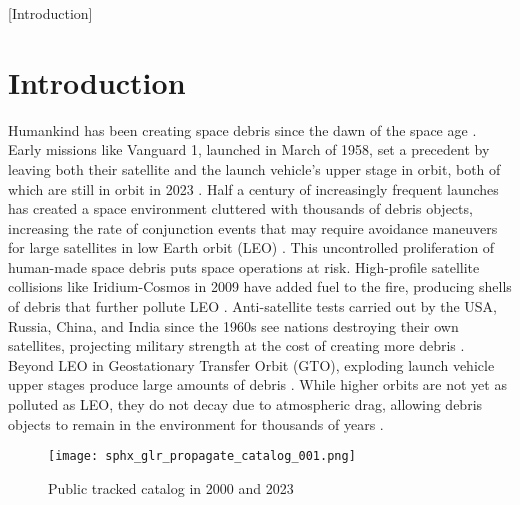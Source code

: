 [Introduction]
\graphicspath{{/Users/liamrobinson/Documents/PyLightCurves/docs/build/html/_images}}

\chapter{Introduction}

Humankind has been creating space debris since the dawn of the space age \cite{esareport2022}. Early missions like Vanguard 1, launched in March of 1958, set a precedent by leaving both their satellite and the launch vehicle's upper stage in orbit, both of which are still in orbit in 2023 \cite{vanguard1}. Half a century of increasingly frequent launches has created a space environment cluttered with thousands of debris objects, increasing the rate of conjunction events that may require avoidance maneuvers for large satellites in low Earth orbit (LEO) \cite{esareport2022}. This uncontrolled proliferation of human-made space debris puts space operations at risk. High-profile satellite collisions like Iridium-Cosmos in 2009 have added fuel to the fire, producing shells of debris that further pollute LEO \cite{vallado4ed}. Anti-satellite tests carried out by the USA, Russia, China, and India since the 1960s see nations destroying their own satellites, projecting military strength at the cost of creating more debris \cite{vallado4ed}. Beyond LEO in Geostationary Transfer Orbit (GTO), exploding launch vehicle upper stages produce large amounts of debris \cite{esareport2022}. While higher orbits are not yet as polluted as LEO, they do not decay due to atmospheric drag, allowing debris objects to remain in the environment for thousands of years \cite{vallado4ed}.

\begin{figure}[ht]
    \centering
    \texttt{[image: sphx\_glr\_propagate\_catalog\_001.png]}
    \caption{Public tracked catalog in 2000 and 2023}
    \label{fig:catalog_comparison}
\end{figure}

